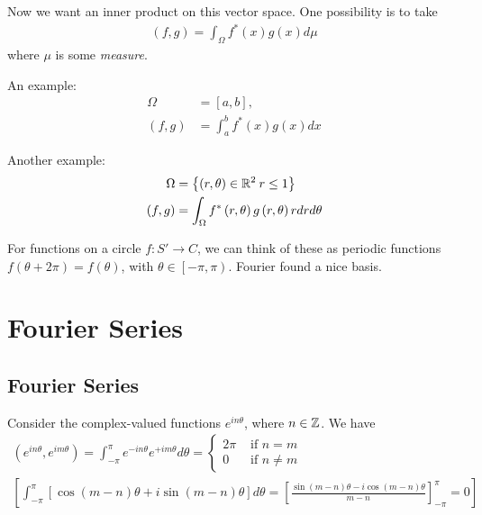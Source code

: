 \documentclass[a4paper]{article}
\begin{document}
Now we want an inner product on this vector space. One possibility is to take
\begin{equation*}
\begin{aligned}
\left(f,g\right) = \int_\Omega f^*\left(x\right)g\left(x\right) d\mu
\end{aligned}
\end{equation*}
where $\mu$ is some \emph{measure}.

An example:
\begin{equation*}
\begin{aligned}
\Omega&=\left[a,b\right],\\
\left(f,g\right) &= \int_a^b f^*\left(x\right)g\left(x\right) dx
\end{aligned}
\end{equation*}

Another example:
\begin{equation*}
\begin{aligned}
\Omega &= \left\{\left(r,\theta\right)\in\mathbb{R}^2\:r\leq 1\right\}\\
\left(f,g\right) &= \int_\Omega f^*\left(r,\theta\right)g\left(r,\theta\right)rdrd\theta
\end{aligned}
\end{equation*}

For functions on a circle $f:S'\to C$, we can think of these as periodic functions $f\left(\theta+2\pi\right)=f\left(\theta\right)$, with $\theta\in\left[-\pi,\pi\right)$. Fourier found a nice basis.

\newpage

\section{Fourier Series}

\subsection{Fourier Series}

Consider the complex-valued functions $e^{in\theta}$, where $n\in\mathbb{Z}$. We have
\begin{equation*}
\begin{aligned}
\left(e^{in\theta},e^{im\theta}\right) = \int_{-\pi}^\pi e^{-in\theta} e^{+im\theta} d\theta = \left\{
\begin{array}{ll}
2\pi & \text{ if } n=m\\
0 & \text{ if } n \neq m
\end{array}
\right.\\
\left[\int_{-\pi}^\pi \left[\cos\left(m-n\right)\theta+i\sin\left(m-n\right) \theta\right] d\theta = \left[\frac{\sin\left(m-n\right) \theta - i\cos \left(m-n\right) \theta}{m-n}\right]_{-\pi}^\pi = 0\right]
\end{aligned}
\end{equation*}
\end{document}
